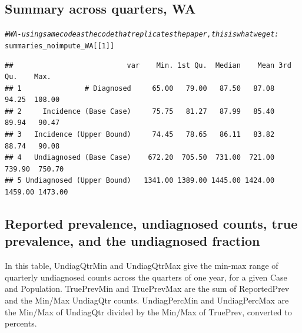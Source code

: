 \documentclass{article}\usepackage[]{graphicx}\usepackage[]{color}
\makeatletter
\newcommand{\hlnum}[1]{\textcolor[rgb]{0.686,0.059,0.569}{#1}}%
\newcommand{\hlcom}[1]{\textcolor[rgb]{0.678,0.584,0.686}{\textit{#1}}}%
\newcommand{\hlstd}[1]{\textcolor[rgb]{0.345,0.345,0.345}{#1}}%
\newenvironment{kframe}{%
 \def\at@end@of@kframe{}%
 \ifinner\ifhmode%
  \def\at@end@of@kframe{\end{minipage}}%
  \begin{minipage}{\columnwidth}%
 \fi\fi%
 \def\FrameCommand##1{\hskip\@totalleftmargin \hskip-\fboxsep
 \colorbox{shadecolor}{##1}\hskip-\fboxsep
     \hskip-\linewidth \hskip-\@totalleftmargin \hskip\columnwidth}%
 \MakeFramed {\advance\hsize-\width
   \@totalleftmargin\z@ \linewidth\hsize
   \@setminipage}}%
 {\par\unskip\endMakeFramed%
 \at@end@of@kframe}
\newenvironment{knitrout}{}{} %
\makeatother
\begin{document}
\subsection{Summary across quarters, WA}
\begin{knitrout}\footnotesize
{}\color{fgcolor}\begin{kframe}
\begin{alltt}
\hlcom{# WA - using same code as the code that replicates the paper, this is what we get:}
\hlstd{summaries_noimpute_WA[[}\hlnum{1}\hlstd{]]}
\end{alltt}
\begin{verbatim}
##                           var    Min. 1st Qu.  Median    Mean 3rd Qu.    Max.
## 1               # Diagnosed     65.00   79.00   87.50   87.08   94.25  108.00
## 2     Incidence (Base Case)     75.75   81.27   87.99   85.40   89.94   90.47
## 3   Incidence (Upper Bound)     74.45   78.65   86.11   83.82   88.74   90.08
## 4   Undiagnosed (Base Case)    672.20  705.50  731.00  721.00  739.90  750.70
## 5 Undiagnosed (Upper Bound)   1341.00 1389.00 1445.00 1424.00 1459.00 1473.00
\end{verbatim}
\end{kframe}
\end{knitrout}






\clearpage
\subsection{Reported prevalence, undiagnosed counts, true prevalence, and the undiagnosed fraction}

In this table, UndiagQtrMin and UndiagQtrMax give the min-max range of quarterly undiagnosed counts across the quarters of one year, for a given Case and Population. TruePrevMin and TruePrevMax are the sum of ReportedPrev and the Min/Max UndiagQtr counts. UndiagPercMin and UndiagPercMax are the Min/Max of UndiagQtr divided by the Min/Max of TruePrev, converted to percents. 
\end{document}
